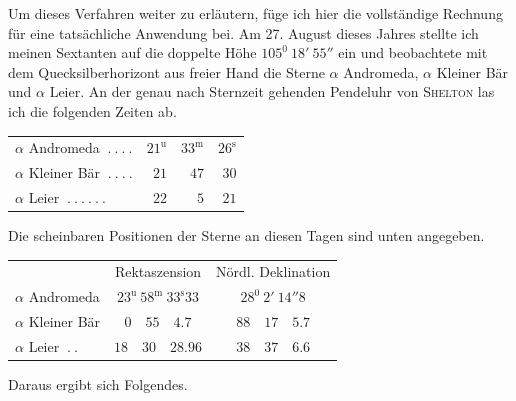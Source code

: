 Um dieses Verfahren weiter zu erläutern, füge ich hier die vollständige Rechnung für eine tatsächliche Anwendung bei. Am 27. August dieses Jahres stellte ich meinen Sextanten auf die doppelte Höhe $105^0\ 18'\ 55''$ ein und beobachtete mit dem Quecksilberhorizont aus freier Hand die Sterne $\alpha$ Andromeda, $\alpha$ Kleiner Bär und $\alpha$ Leier. An der genau nach Sternzeit gehenden Pendeluhr von \textsc{Shelton} las ich die folgenden Zeiten ab.
\begin{center}
\begin{tabular}{lrrr}
$\alpha$ Andromeda $\ .\ .\ .\ .$&$21^{\mathrm u}$&$33^{\mathrm m}$&$26^{\mathrm s}$\\
$\alpha$ Kleiner Bär $\ .\ .\ .\ .$&$21$&$47$&$30$\\
$\alpha$ Leier $\ .\ .\ .\ .\ .\ .$&$22$&$5$&$21$
\end{tabular}
\end{center}
Die scheinbaren Positionen der Sterne an diesen Tagen sind unten angegeben.
\begin{center}
\small
\begin{tabular}{lcc}
&Rektaszension&Nördl. Deklination\\
$\alpha$ Andromeda&$23^{\mathrm u}\ 58^{\mathrm m}\ 33^{\mathrm s}33$&$28^0\ 2'\ 14''8$\\
$\alpha$ Kleiner Bär&$0\quad55\quad4.7$&$88\quad17\quad5.7$\\
$\alpha$ Leier $\ .\ .$&$18\quad30\quad28.96$&$38\quad37\quad6.6$
\end{tabular}
\end{center}
Daraus ergibt sich Folgendes.
%
